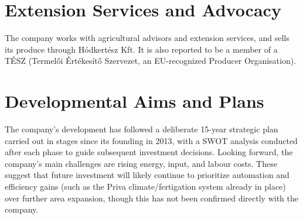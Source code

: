 \section{Extension Services and Advocacy}
The company works with agricultural advisors and extension services, and sells its produce through Hódkertész Kft. It is also reported to be a member of a TÉSZ (Termelői Értékesítő Szervezet, an EU-recognized Producer Organisation). 
\section{Developmental Aims and Plans}
The company's development has followed a deliberate 15-year strategic plan carried out in stages since its founding in 2013, with a SWOT analysis conducted after each phase to guide subsequent investment decisions. Looking forward, the company's main challenges are rising energy, input, and labour costs. These suggest that future investment will likely continue to prioritize automation and efficiency gains (such as the Priva climate/fertigation system already in place) over further area expansion, though this has not been confirmed directly with the company.